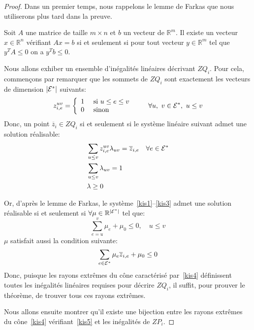 \begin{proof}

Dans un premier temps, nous rappelons le lemme de Farkas que nous
utiliserons plus tard dans la preuve. 

\begin{lemma}
\label{Farkas_Lemma}
Soit $A$ une matrice de taille $m \times n$ et $b$ un vecteur de
$\mathbb{R}^m$. Il existe un vecteur $x \in \mathbb{R}^n$ vérifiant
$Ax = b$ si et seulement si pour tout vecteur $y \in \mathbb{R}^m$
tel que $ y^TA\le 0$ on a $y^Tb \le 0$. 
\end{lemma}

Nous allons exhiber un ensemble d'inégalités linéaires décrivant
$ZQ_i$. Pour cela, commençons par remarquer que les sommets de $ZQ_i$
sont exactement les vecteurs de dimension $|{\cal E}^*|$ suivants:
\[
z_{i,e}^{uv}=\left\{
\begin{array}{ll}
1 & \text{ si }u \le e \le v\\
0 & \text{ sinon}
\end{array}
\right. \qquad \forall u,\ v \in {\cal E}^*,\ u \le v
\]
Donc, un point $\overline{z}_i \in ZQ_i$ si et seulement si le système
linéaire suivant admet une solution réalisable:
\begin{align}
& \sum_{u\le v} z_{i,e}^{uv} \lambda_{uv} = \overline{z}_{i,e} & &
\forall e \in {\cal E}^* \label{kis1}\\
&\sum_{u \le v} \lambda_{uv} =1 & & \label{kis2}\\
&\lambda \ge 0 & & \label{kis3}
\end{align}

Or, d'après le lemme de Farkas, le
système~\eqref{kis1}--\eqref{kis3} admet une solution réalisable si et
seulement si $\forall \mu \in \mathbb{R}^{|{\cal E}^*|}$ tel que: 
\begin{equation}
\sum_{e=u}^{v} \mu_e + \mu_0 \le 0, \quad u \le v 
\label{kis4} 
\end{equation}
$\mu$ satisfait aussi la condition suivante: 
\begin{equation}
\sum_{e \in {\cal E}^*} \mu_e \overline{z}_{i,e}+ \mu_0 \le 0
\label{kis5}
\end{equation}
Donc, puisque les rayons extrêmes du cône caractérisé par~\eqref{kis4}
définissent toutes les inégalités linéaires requises pour décrire
$ZQ_i$, il suffit, pour prouver le théorème, de trouver tous ces
rayons extrêmes. 

Nous allons ensuite montrer qu'il existe une bijection entre les
rayons extrêmes du cône~\eqref{kis4} vérifiant~\eqref{kis5} et les
inégalités de $ZP_i$.


\end{proof}
